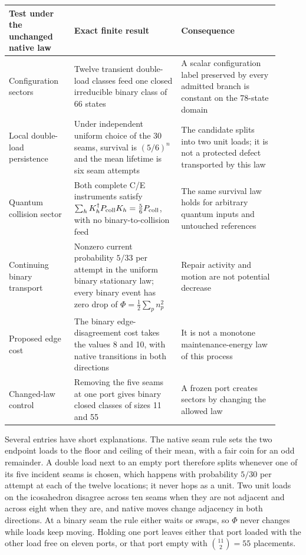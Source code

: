 \documentclass[11pt]{article}
\begin{document}
\begin{center}
\small
\begin{tabular}{p{0.22\linewidth}p{0.36\linewidth}p{0.33\linewidth}}
\toprule
Test under the unchanged native law & Exact finite result & Consequence \\
\midrule
Configuration sectors & Twelve transient double-load classes feed one
closed irreducible binary class of 66 states & A scalar configuration label
preserved by every admitted branch is constant on the 78-state domain \\
Local double-load persistence & Under independent uniform choice of the 30
seams, survival is \((5/6)^n\) and the mean lifetime is six seam attempts &
The candidate splits into two unit loads; it is not a protected defect
transported by this law \\
Quantum collision sector & Both complete C/E instruments satisfy
\(\sum_hK_h^\dagger P_{\rm coll}K_h=\tfrac56P_{\rm coll}\), with no
binary-to-collision feed & The same survival law holds for arbitrary quantum
inputs and untouched references \\
Continuing binary transport & Nonzero current probability \(5/33\) per
attempt in the uniform binary stationary law; every binary event has zero
drop of \(\Phi=\tfrac12\sum_pn_p^2\) & Repair activity and motion are not
potential decrease \\
Proposed edge cost & The binary edge-disagreement cost takes the values 8
and 10, with native transitions in both directions & It is not a monotone
maintenance-energy law of this process \\
Changed-law control & Removing the five seams at one port gives binary
closed classes of sizes 11 and 55 & A frozen port creates sectors by
changing the allowed law \\
\bottomrule
\end{tabular}
\end{center}

Several entries have short explanations. The native seam rule sets the two
endpoint loads to the floor and ceiling of their mean, with a fair coin for
an odd remainder. A double load next to an empty port therefore splits
whenever one of its five incident seams is chosen, which happens with
probability \(5/30\) per attempt at each of the twelve locations; it never
hops as a unit. Two unit loads on the icosahedron disagree across ten seams
when they are not adjacent and across eight when they are, and native moves
change adjacency in both directions. At a binary seam the rule either waits
or swaps, so \(\Phi\) never changes while loads keep moving. Holding one
port leaves either that port loaded with the other load free on eleven
ports, or that port empty with \(\binom{11}{2}=55\) placements.
\end{document}
